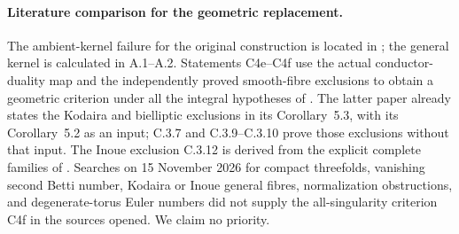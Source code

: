 \paragraph{Literature comparison for the geometric replacement.}
The ambient-kernel failure for the original construction is
located in \cite[Section~10]{AC26}; the general kernel is
calculated in A.1--A.2. Statements C4e--C4f use the actual
conductor-duality map and the independently proved
smooth-fibre exclusions to obtain a geometric criterion
under all the integral hypotheses of \cite[Theorem~2.2]{CDP20}.
The latter paper already states the Kodaira and bielliptic
exclusions in its Corollary~5.3, with its Corollary~5.2 as
an input; C.3.7 and C.3.9--C.3.10 prove those exclusions
without that input. The Inoue exclusion C.3.12 is derived
from the explicit complete families of \cite{Inoue1974}.
Searches on 15 November 2026 for compact threefolds,
vanishing second Betti number, Kodaira or Inoue general
fibres, normalization obstructions, and degenerate-torus
Euler numbers did not supply the all-singularity
criterion C4f in the sources opened. We claim no priority.

